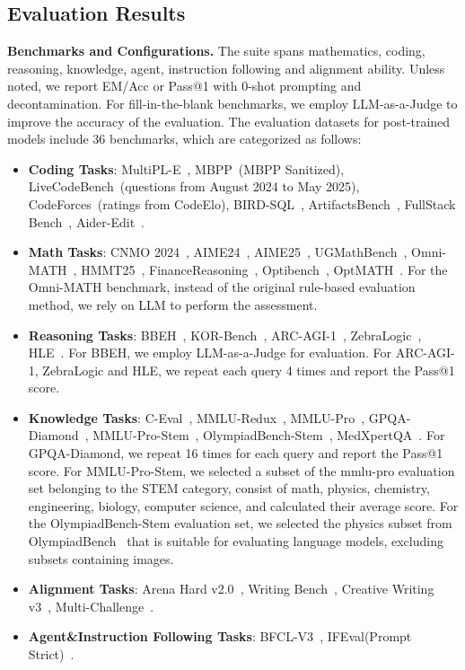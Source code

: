 \subsection{Evaluation Results}

{\bfseries Benchmarks and Configurations.} 
The suite spans mathematics, coding, reasoning, knowledge, agent, instruction following and alignment ability. Unless noted, we report EM/Acc or Pass@1 with 0-shot prompting and decontamination. For fill-in-the-blank benchmarks, we employ LLM-as-a-Judge to improve the accuracy of the evaluation. The evaluation datasets for post-trained models include 36 benchmarks, which are categorized as follows:
\begin{itemize}
    \item \textbf{Coding Tasks}: MultiPL-E~\citep{cassano2022multipl}, MBPP~\citep{austin2021program}(MBPP Sanitized), LiveCodeBench~\citep{livecodebench}(questions from August 2024 to May 2025), CodeForces~\citep{quan2025codeelo}(ratings from CodeElo), BIRD-SQL~\citep{li2023can}, ArtifactsBench~\citep{artifactsbench}, FullStack Bench~\citep{cheng2024fullstack}, Aider-Edit~\citep{aider}. 
    \item \textbf{Math Tasks}: CNMO 2024~\citep{livemathbench}, AIME24~\citep{aime24}, AIME25~\citep{aime25}, UGMathBench~\citep{xu2025ugmathbench}, Omni-MATH~\citep{omni-math}, HMMT25~\citep{HMMT25}, FinanceReasoning~\citep{FinanceReasoning}, Optibench~\citep{optibench}, OptMATH~\citep{optmath}. For the Omni-MATH benchmark, instead of the original rule-based evaluation method, we rely on LLM to perform the assessment.
    \item \textbf{Reasoning Tasks}: BBEH~\citep{bbeh}, KOR-Bench~\citep{korbench}, ARC-AGI-1~\citep{arc-agi}, ZebraLogic~\citep{zebralogic}, HLE~\citep{hle}. For BBEH, we employ LLM-as-a-Judge for evaluation. For ARC-AGI-1, ZebraLogic and HLE, we repeat each query 4 times and report the Pass@1 score. 
    \item \textbf{Knowledge Tasks}: C-Eval~\citep{ceval},  MMLU-Redux~\citep{mmlu}, MMLU-Pro~\citep{mmlu-pro}, GPQA-Diamond~\citep{gpqa}, MMLU-Pro-Stem~\citep{mmlu-pro}, OlympiadBench-Stem~\citep{he2024olympiadbench}, MedXpertQA~\citep{zuomedxpertqa}. For GPQA-Diamond, we repeat 16 times for each query and report the Pass@1 score. For MMLU-Pro-Stem, we selected a subset of the mmlu-pro evaluation set belonging to the STEM category, consist of math, physics, chemistry, engineering, biology, computer science, and calculated their average score. For the OlympiadBench-Stem evaluation set, we selected the physics subset from OlympiadBench~\citep{he2024olympiadbench} that is suitable for evaluating language models, excluding subsets containing images.
    \item \textbf{Alignment Tasks}: Arena Hard v2.0~\citep{li2024crowdsourced,arenahard2024}, Writing Bench~\citep{wu2025writingbench}, Creative Writing v3~\citep{creative-writing-bench-v3}, Multi-Challenge~\citep{deshpande-etal-2025-multichallenge}.
    \item \textbf{Agent\&Instruction Following Tasks}: BFCL-V3~\citep{berkeley-function-calling-leaderboard}, IFEval(Prompt Strict)~\citep{zhou2023instruction}.
\end{itemize}

